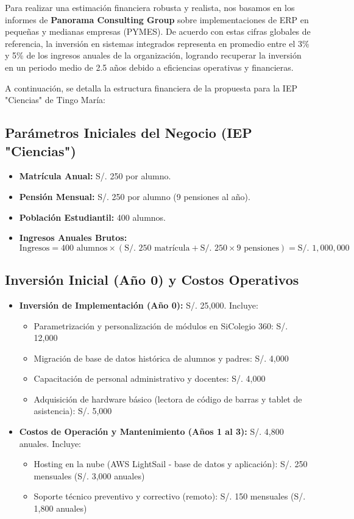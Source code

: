 \documentclass[12pt,a4paper,oneside]{report}
\begin{document}
Para realizar una estimación financiera robusta y realista, nos basamos en los informes de \textbf{Panorama Consulting Group} sobre implementaciones de ERP en pequeñas y medianas empresas (PYMES). De acuerdo con estas cifras globales de referencia, la inversión en sistemas integrados representa en promedio entre el 3\% y 5\% de los ingresos anuales de la organización, logrando recuperar la inversión en un periodo medio de 2.5 años debido a eficiencias operativas y financieras.

A continuación, se detalla la estructura financiera de la propuesta para la IEP "Ciencias" de Tingo María:

\subsection{Parámetros Iniciales del Negocio (IEP "Ciencias")}
\begin{itemize}
    \item \textbf{Matrícula Anual:} S/. 250 por alumno.
    \item \textbf{Pensión Mensual:} S/. 250 por alumno (9 pensiones al año).
    \item \textbf{Población Estudiantil:} 400 alumnos.
    \item \textbf{Ingresos Anuales Brutos:} 
    \[ \text{Ingresos} = 400 \text{ alumnos} \times (\text{S/. } 250 \text{ matrícula} + \text{S/. } 250 \times 9 \text{ pensiones}) = \text{S/. } 1,000,000 \]
\end{itemize}

\subsection{Inversión Inicial (Año 0) y Costos Operativos}
\begin{itemize}
    \item \textbf{Inversión de Implementación (Año 0):} S/. 25,000. Incluye:
        \begin{itemize}
            \item Parametrización y personalización de módulos en SiColegio 360: S/. 12,000
            \item Migración de base de datos histórica de alumnos y padres: S/. 4,000
            \item Capacitación de personal administrativo y docentes: S/. 4,000
            \item Adquisición de hardware básico (lectora de código de barras y tablet de asistencia): S/. 5,000
        \end{itemize}
    \item \textbf{Costos de Operación y Mantenimiento (Años 1 al 3):} S/. 4,800 anuales. Incluye:
        \begin{itemize}
            \item Hosting en la nube (AWS LightSail - base de datos y aplicación): S/. 250 mensuales (S/. 3,000 anuales)
            \item Soporte técnico preventivo y correctivo (remoto): S/. 150 mensuales (S/. 1,800 anuales)
        \end{itemize}
\end{itemize}
\end{document}
